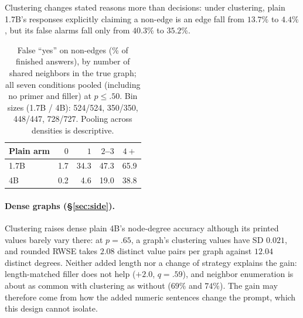 \documentclass[11pt]{article}
\begin{document}
Clustering changes stated reasons more than decisions: under clustering, plain 1.7B's responses explicitly claiming a non-edge is an edge fall from $13.7\%$ to $4.4\%$, but its false alarms fall only from $40.3\%$ to $35.2\%$. %
\begin{table}[H]
\centering\footnotesize\setlength{\tabcolsep}{4pt}
\begin{tabular}{lrrrr}
\toprule
Plain arm & $0$ & $1$ & $2$--$3$ & $4+$\\
\midrule
1.7B & 1.7 & 34.3 & 47.3 & 65.9\\ %
4B & 0.2 & 4.6 & 19.0 & 38.8\\ %
\bottomrule
\end{tabular}
\caption{False ``yes'' on non-edges (\% of finished answers), by number of shared neighbors in the true graph; all seven conditions pooled (including no primer and filler) at $p\leq.50$. Bin sizes (1.7B / 4B): 524/524, 350/350, 448/447, 728/727. Pooling across densities is descriptive.} %
\label{tab:shared}
\end{table}

\paragraph{Dense graphs (\S\ref{sec:side}).} Clustering raises dense plain 4B's node-degree accuracy although its printed values barely vary there: at $p=.65$, a graph's clustering values have SD $0.021$, and rounded RWSE takes $2.08$ distinct value pairs per graph against $12.04$ distinct degrees. %
Neither added length nor a change of strategy explains the gain: length-matched filler does not help ($+2.0$, $q=.59$), and neighbor enumeration is about as common with clustering as without ($69\%$ and $74\%$). The gain may therefore come from how the added numeric sentences change the prompt, which this design cannot isolate. %
\end{document}
